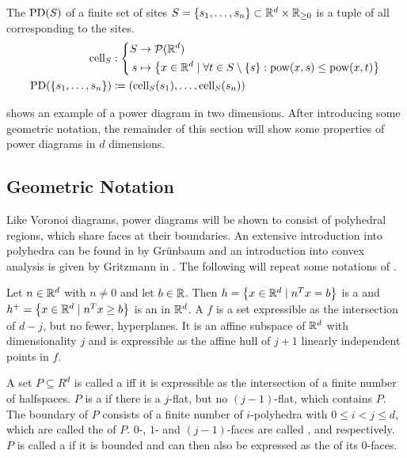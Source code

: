 \newpage %
\begin{definition}
    \label{def:powerdiagram}
    The  $\operatorname{PD}(S)$ of a finite set of sites $S = \left\{ s_1, \dots, s_n \right\} \subset \mathbb{R}^d \times \mathbb{R}_{\geq 0}$ is a tuple of all  corresponding to the sites.
    \begin{align}
        \operatorname{cell}_S &: \left\{\begin{aligned}
            S &\to \mathcal{P}(\mathbb{R}^d)\\
            s &\mapsto \left\{ x \in \mathbb{R}^d \mid \forall t \in S \setminus \left\{ s \right\}: \operatorname{pow}(x, s) \leq \operatorname{pow}(x, t) \right\}
        \end{aligned}\right.\\
        \operatorname{PD}(\left\{ s_1, \dots, s_n \right\}) &\coloneqq \left( \operatorname{cell}_S(s_1), \dots, \operatorname{cell}_S(s_n) \right)
    \end{align}
\end{definition}

 shows an example of a power diagram in two dimensions.
After introducing some geometric notation, the remainder of this section will show some properties of power diagrams in $d$ dimensions.

\subsection{Geometric Notation}
\label{sub:geometric_notation}
Like Voronoi diagrams, power diagrams will be shown to consist of polyhedral regions, which share faces at their boundaries.
An extensive introduction into polyhedra can be found in \cite{grunbaum2003convex} by Grünbaum and an introduction into convex analysis is given by Gritzmann in \cite{gritzmann2013grundlagen}.
The following will repeat some notations of \cite{aurenhammer1987power}.

Let $n \in \mathbb{R}^d$ with $n \neq 0$ and let $b \in \mathbb{R}$.
Then $h = \left\{ x \in \mathbb{R}^d \mid n^T x = b \right\}$ is a  and $h^+ = \left\{ x \in \mathbb{R}^d \mid n^T x \geq b \right\}$ is an  in $\mathbb{R}^d$.
A  $f$ is a set expressible as the intersection of $d - j$, but no fewer, hyperplanes.
It is an affine subspace of $\mathbb{R}^d$ with dimensionality $j$ and is expressible as the affine hull of $j + 1$ linearly independent points in $f$.

A set $P \subseteq R^d$ is called a  iff it is expressible as the intersection of a finite number of halfspaces.
$P$ is a  if there is a $j$-flat, but no $(j-1)$-flat, which contains $P$.
The boundary of $P$ consists of a finite number of $i$-polyhedra with $0 \leq i < j \leq d$, which are called the  of $P$.
$0$-, $1$- and $(j - 1)$-faces are called ,  and  respectively.
$P$ is called a  if it is bounded and can then also be expressed as the  of its $0$-faces.

